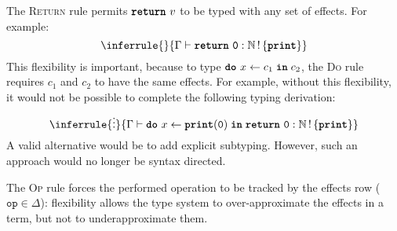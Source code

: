 The \textsc{Return} rule permits $\texttt{\textbf{return}} \,\, {v}$ to be typed with any set of effects. For example:
\[\inferrule{ }{\type[]{\return{\texttt{0}}}{\effectType[\{ \textbf{\texttt{print}} \}]{\mathbb{N}}}}\] 
This flexibility is important, because to type $\texttt{\textbf{do}} \,\, {x} \leftarrow {c_1} \; \textbf{\texttt{in}} \; {c_2}$, the \textsc{Do} rule requires $c_1$ and $c_2$ to have the same effects. For example, without this flexibility, it would not be possible to complete the following typing derivation:
\[\inferrule{\vdots}{\type[]{\bind{x}{\print{0}}{\return{\texttt{0}}}}{\effectType[\{ \textbf{\texttt{print}} \}]{\mathbb{N}}}}\] 
A valid alternative would be to add explicit subtyping. However, such an approach would no longer be syntax directed. 

The \textsc{Op} rule forces the performed operation to be tracked by the effects row ($\texttt{op} \in \Delta$): flexibility allows the type system to over-approximate the effects in a term, but not to underapproximate them. 

